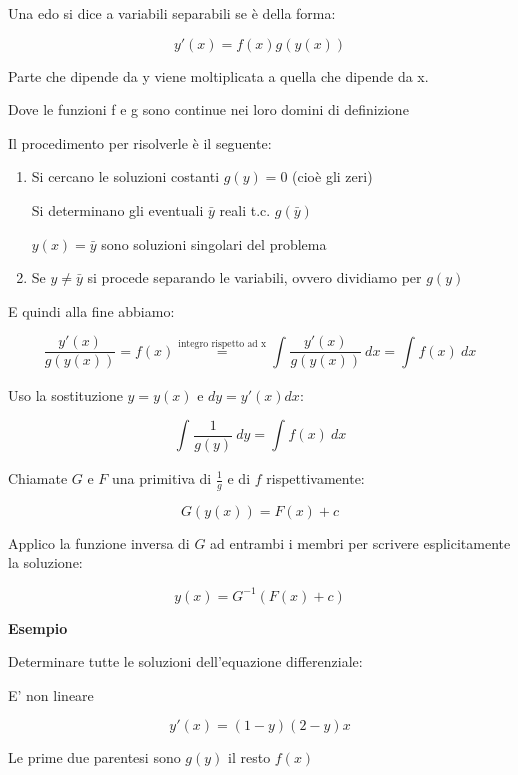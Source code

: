 \documentclass[11pt]{article}
\begin{document}
Una edo si dice a variabili separabili se è della forma:

\[
    y'(x) = f(x) g(y(x))
\]

Parte che dipende da y viene moltiplicata a quella che dipende da x.

Dove le funzioni f e g sono continue nei loro domini di definizione

Il procedimento per risolverle è il seguente:

\begin{enumerate}
    \item Si cercano le soluzioni costanti $g(y)=0$ (cioè gli zeri)

        Si determinano gli eventuali $\bar y$ reali t.c. $g(\bar y)$

        $y(x)= \bar y$ sono soluzioni singolari del problema 
        
    \item Se $y \neq \bar y$ si procede separando le variabili, ovvero dividiamo per $g(y)$
\end{enumerate}

E quindi alla fine abbiamo:

\[
    \frac{y'(x)}{g(y(x))} = f(x) \overset{\text{integro rispetto ad x}}{=} \int_{{}}^{{}} {\frac{y'(x)}{g(y(x))} } \: d{x} {} = \int_{{}}^{{}} {f(x)} \: d{x} {}
\]

Uso la sostituzione $y = y(x)$ e $dy = y'(x) dx$:

\[
    \int_{{}}^{{}} {\frac{1}{g(y)} } \: d{y} = {\int_{{}}^{{}} {f(x)} \: d{x} {}}
\]

Chiamate $G$ e $F$ una primitiva di $\frac{1}{g} $ e di $f$ rispettivamente:

\[
    G(y(x)) = F(x) + c
\]

Applico la funzione inversa di $G$ ad entrambi i membri per scrivere esplicitamente la soluzione:

\[
    y(x) = G ^{-1} (F(x) + c)
\]

\textbf{Esempio}

Determinare tutte le soluzioni dell'equazione differenziale:

E' non lineare

\[
    y'(x) = (1-y)(2-y)x
\]

Le prime due parentesi sono $g(y)$ il resto $f(x)$
\end{document}
